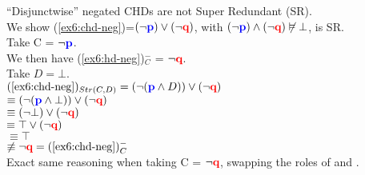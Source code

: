 \begin{exe}
	\ex\label{ex6:chd-neg-sr} {``Disjunctwise'' negated CHDs are not Super Redundant (SR).\\
		We show (\ref{ex6:chd-neg})=$(\neg\textbf{\textcolor{blue}{p}})\vee(\neg\textbf{\textcolor{red}{q}})$, with $(\neg\textbf{\textcolor{blue}{p}}) \wedge (\neg\textbf{\textcolor{red}{q}}) \not\vDash \bot$, is SR.\\
		Take C = $\neg\textbf{\textcolor{blue}{p}}$.\\
		We then have (\ref{ex6:hd-neg})$^-_C$ = $\neg\textbf{\textcolor{red}{q}}$.\\
		Take $D=\bot$.\\
		$(\textref{ex6:chd-neg})_{Str(C, D)} = (\neg(\p \wedge D)) \vee (\neg\q)$\\
		 $\equiv (\neg(\textbf{\textcolor{blue}{p}} \wedge \bot)) \vee (\neg\textbf{\textcolor{red}{q}})$\\
		 $\equiv (\neg\bot) \vee (\neg\textbf{\textcolor{red}{q}})$\\
		 $\equiv \top \vee (\neg\textbf{\textcolor{red}{q}})$\\
		 $\equiv \top$\\
		 $\not\equiv \neg\q = (\textref{ex6:chd-neg})^-_C$\\
		Exact same reasoning when taking C = $\neg\textbf{\textcolor{red}{q}}$, swapping the roles of \p{} and \q.
	}
\end{exe}

